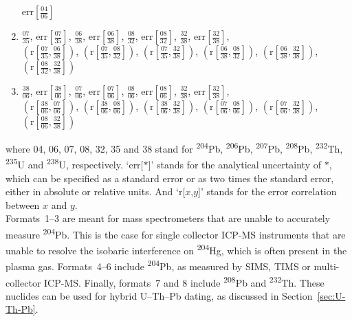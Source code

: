 \begin{refsection}
\begin{enumerate}
  $\mbox{err}\!\left[\frac{04}{06}\right]$
  \item 
  $\frac{07}{35}$,  
  $\mbox{err}\!\left[\frac{07}{35}\right]$, 
  $\frac{06}{38}$,  
  $\mbox{err}\!\left[\frac{06}{38}\right]$,  
  $\frac{08}{32}$,  
  $\mbox{err}\!\left[\frac{08}{32}\right]$,  
  $\frac{32}{38}$,  
  $\mbox{err}\!\left[\frac{32}{38}\right]$,  \\
  $\left(\mbox{r}\!\left[\frac{07}{35},\frac{06}{38}\right]\right)$,  
  $\left(\mbox{r}\!\left[\frac{07}{35},\frac{08}{32}\right]\right)$, 
  $\left(\mbox{r}\!\left[\frac{07}{35},\frac{32}{38}\right]\right)$,  
  $\left(\mbox{r}\!\left[\frac{06}{38},\frac{08}{32}\right]\right)$,  
  $\left(\mbox{r}\!\left[\frac{06}{38},\frac{32}{38}\right]\right)$, 
  $\left(\mbox{r}\!\left[\frac{08}{32},\frac{32}{38}\right]\right)$
  \item
  $\frac{38}{06}$,  
  $\mbox{err}\!\left[\frac{38}{06}\right]$, 
  $\frac{07}{06}$,  
  $\mbox{err}\!\left[\frac{07}{06}\right]$,  
  $\frac{08}{06}$,  
  $\mbox{err}\!\left[\frac{08}{06}\right]$,  
  $\frac{32}{38}$,  
  $\mbox{err}\!\left[\frac{32}{38}\right]$,  \\
  $\left(\mbox{r}\!\left[\frac{38}{06},\frac{07}{06}\right]\right)$,  
  $\left(\mbox{r}\!\left[\frac{38}{06},\frac{08}{06}\right]\right)$, 
  $\left(\mbox{r}\!\left[\frac{38}{06},\frac{32}{38}\right]\right)$,  
  $\left(\mbox{r}\!\left[\frac{07}{06},\frac{08}{06}\right]\right)$,  
  $\left(\mbox{r}\!\left[\frac{07}{06},\frac{32}{38}\right]\right)$, 
  $\left(\mbox{r}\!\left[\frac{08}{06},\frac{32}{38}\right]\right)$
\end{enumerate}

\noindent where 04, 06, 07, 08, 32, 35 and 38 stand for
\textsuperscript{204}Pb, \textsuperscript{206}Pb,
\textsuperscript{207}Pb, \textsuperscript{208}Pb,
\textsuperscript{232}Th, \textsuperscript{235}U and
\textsuperscript{238}U, respectively. `err[$\ast$]' stands for the
analytical uncertainty of $\ast$, which can be specified as a standard
error or as two times the standard error, either in absolute or
relative units. And `r[$x$,$y$]' stands for the error correlation
between $x$ and $y$.\\

Formats~1--3 are meant for mass spectrometers that are unable to
accurately measure \textsuperscript{204}Pb. This is the case for
single collector ICP-MS instruments that are unable to resolve the
isobaric interference on \textsuperscript{204}Hg, which is often
present in the plasma gas. Formats~4--6 include
\textsuperscript{204}Pb, as measured by SIMS, TIMS or multi-collector
ICP-MS. Finally, formats~7 and 8 include \textsuperscript{208}Pb and
\textsuperscript{232}Th. These nuclides can be used for hybrid
U--Th--Pb dating, as discussed in Section~\ref{sec:U-Th-Pb}.\\


\end{refsection}
